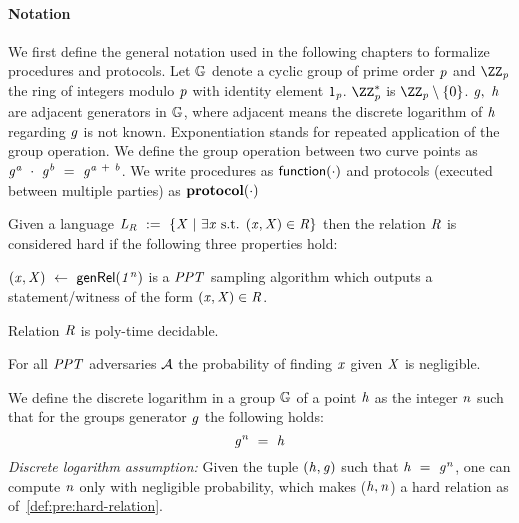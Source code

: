 \paragraph{Notation}
We first define the general notation used in the following chapters to formalize procedures and protocols.
Let $\mathbb{G}$ denote a cyclic group of prime order $\mathit{p}$ and $\cnstIntegersPrime{\varPrime}$ the ring of integers modulo $\mathit{p}$ with identity element $1_{\mathit{p}}$.
$\cnstIntegersPrimeWithoutZero{\varPrime}$ is $\cnstIntegersPrime{\varPrime} \opExcluding \funList{0}$.
$\mathit{g} ,~ \mathit{h}$ are adjacent generators in $\mathbb{G}$, where adjacent means the discrete logarithm of $\mathit{h}$ regarding $\mathit{g}$ is not known.
Exponentiation stands for repeated application of the group operation.
We define the group operation between two curve points as $\mathit{g}^{\mathit{a}} ~\cdot~ \mathit{g}^{\mathit{b}} ~=~ \mathit{g}^{\mathit{a} ~+~ \mathit{b}}$.
We write procedures as $\mathsf{function(\cdot)}$ and protocols (executed between multiple parties) as $\mathbf{protocol(\cdot)}$ 

\begin{definition}\label{def:pre:hard-relation}
    Given a language $\mathit{L}_{\mathit{R}} ~:=~ \{\mathit{X} ~|~ \exists \mathit{x} \text{ s.t. } (\mathit{x},\mathit{X}) \in \mathit{R}\}$ then the relation $\mathit{R}$ is considered hard if the following three properties hold:
    \begin{asparaenum}
        \item $(\mathit{x}, \mathit{X}) ~\leftarrow~ \mathsf{genRel}(\mathit{1^n})$ is a $\mathit{PPT}$ sampling algorithm which outputs a statement/witness of the form $(\mathit{x}, \mathit{X}) \in \mathit{R}$.
        \item Relation $\mathit{R}$ is poly-time decidable.
        \item For all $\mathit{PPT}$ adversaries $\mathcal{A}$ the probability of finding $\mathit{x}$ given $\mathit{X}$ is negligible.
    \end{asparaenum}
\end{definition}

\begin{definition}\label{def:pre:discretelog}
    We define the discrete logarithm in a group $\mathbb{G}$ of a point $\mathit{h}$ as the integer $\mathit{n}$ such that for the groups generator $\mathit{g}$ the following holds:
    \[ \mathit{g}^{\mathit{n}} ~=~ \mathit{h} \]
    \textit{Discrete logarithm assumption:} Given the tuple $(\mathit{h},\mathit{g})$ such that $\mathit{h} ~=~ \mathit{g}^{\mathit{n}}$, one can compute $\mathit{n}$ only with negligible probability, which makes ($\mathit{h}, \mathit{n}$) a hard relation as of~\cref{def:pre:hard-relation}.
\end{definition}

